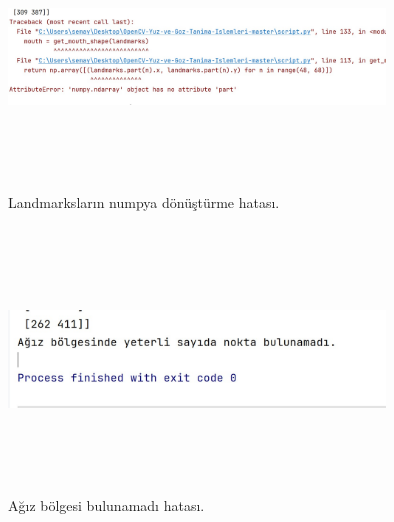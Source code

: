 \documentclass[12pt, a4paper]{article}
\begin{document}
	\begin{figure}[htbp]
		\centering
		\includegraphics[width=10cm, height=7cm, keepaspectratio]{hataa.jpg}
		\caption{Landmarksların numpya dönüştürme hatası.}
	\end{figure}\begin{figure}[htbp]
		\centering
		\includegraphics[width=10cm, height=7cm, keepaspectratio]{agizhatasi.jpg}
		\caption{Ağız bölgesi bulunamadı hatası.}
		
	\end{figure}\newpage
\end{document}
